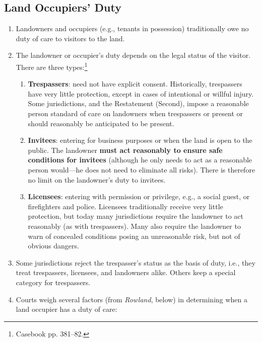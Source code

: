 \subsection{Land Occupiers' Duty}

\begin{enumerate}
    \item Landowners and occupiers (e.g., tenants in possession) traditionally 
    owe no duty of care to visitors to the land.  
    \item The landowner or occupier's duty depends on the legal status of the 
    visitor.  There are three types:\footnote{Casebook pp. 381--82.}
    \begin{enumerate}
        \item \textbf{Trespassers}: need not have explicit consent.  
        Historically, trespassers have very little protection, except in cases 
        of intentional or willful injury. Some jurisdictions, and the 
        Restatement (Second), impose a reasonable person standard of care on 
        landowners when trespassers or present or should reasonably be 
        anticipated to be present.
        \item \textbf{Invitees}: entering for business purposes or when the 
        land is open to the public. The landowner \textbf{must act reasonably 
        to ensure safe conditions for invitees} (although he only needs to act 
        as a reasonable person would---he does not need to eliminate all 
        risks).  There is therefore no limit on the landowner's duty to 
        invitees.
        \item \textbf{Licensees}: entering with permission or privilege, e.g., 
        a social guest, or firefighters and police. Licensees traditionally 
        receive very little protection, but today many jurisdictions require 
        the landowner to act reasonably (as with trespassers). Many also 
        require the landowner to warn of concealed conditions posing an 
        unreasonable risk, but not of obvious dangers.
    \end{enumerate}
    \item Some jurisdictions reject the trespasser's status as the basis of 
    duty, i.e., they treat trespassers, licensees, and landowners alike.  
    Others keep a special category for trespassers.
    \item Courts weigh several factors (from \emph{Rowland}, below) in 
    determining when a land occupier has a duty of care:
    \begin{enumerate}

\end{enumerate}
\end{enumerate}
